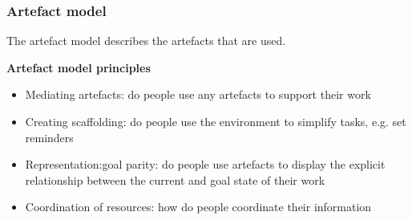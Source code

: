 %
%
%


\subsubsection{Artefact model}
The artefact model describes the artefacts that are used. 

\begin{framed}\noindent
\textbf{Artefact model principles}  \\
\begin{itemize}
\item Mediating artefacts: do people use any artefacts to support their work
\item Creating scaffolding: do people use the environment to simplify tasks, e.g. set reminders
\item Representation:goal parity: do people use artefacts to display the explicit relationship between the current and goal state of their work
\item Coordination of resources: how do people coordinate their information
\end{itemize}
\end{framed}

